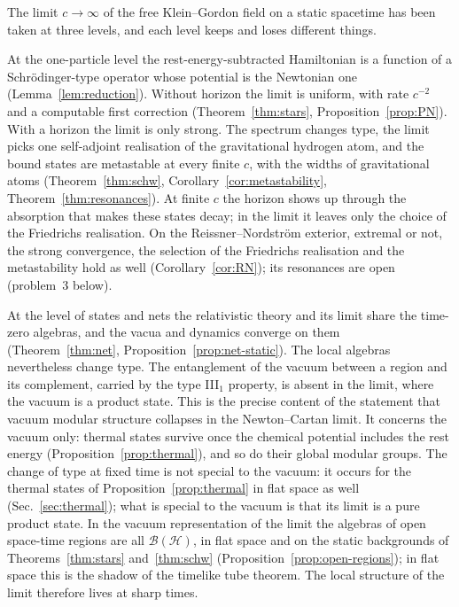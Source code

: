 \documentclass[%
 aip,
 jmp,
 amsmath,amssymb,
 reprint, onecolumn
]{revtex4-1}
\theoremstyle{definition}
\theoremstyle{remark}
\newcommand{\Hil}{\mathcal{H}}
\begin{document}
The limit $c\to\infty$ of the free Klein--Gordon field on a static
spacetime has been taken at three levels, and each level keeps and loses
different things.

At the one-particle level the rest-energy-subtracted Hamiltonian is a
function of a Schr\"odinger-type operator whose potential is the
Newtonian one (Lemma~\ref{lem:reduction}). Without horizon the limit is
uniform, with rate $c^{-2}$ and a computable first correction
(Theorem~\ref{thm:stars}, Proposition~\ref{prop:PN}). With a horizon
the limit is only strong. The spectrum changes type, the limit picks
one self-adjoint realisation of the gravitational hydrogen atom, and the
bound states are metastable at every finite $c$, with the widths of
gravitational atoms (Theorem~\ref{thm:schw},
Corollary~\ref{cor:metastability}, Theorem~\ref{thm:resonances}). At
finite $c$ the horizon shows up through the absorption that makes these
states decay; in the limit it leaves only the choice of the Friedrichs
realisation. On the Reissner--Nordstr\"om exterior, extremal or not,
the strong convergence, the selection of the Friedrichs realisation and
the metastability hold as well (Corollary~\ref{cor:RN}); its resonances
are open (problem~3 below).

At the level of states and nets the relativistic theory and its limit
share the time-zero algebras, and the vacua and dynamics converge on
them (Theorem~\ref{thm:net}, Proposition~\ref{prop:net-static}). The
local algebras nevertheless change type. The entanglement of the vacuum
between a region and its complement, carried by the type III$_1$
property, is absent in the limit, where the vacuum is a product state.
This is the precise content of the statement that vacuum modular
structure collapses in the Newton--Cartan limit. It concerns the vacuum
only: thermal states survive once the chemical potential includes the
rest energy (Proposition~\ref{prop:thermal}), and so do their global
modular groups. The change of type at fixed time is not special to the
vacuum: it occurs for the thermal states of
Proposition~\ref{prop:thermal} in flat space as well
(Sec.~\ref{sec:thermal}); what is special to the vacuum is that its
limit is a pure product state. In the vacuum representation of the limit the algebras of
open space-time regions are all $\mathcal{B}(\Hil)$, in flat space and on
the static backgrounds of
Theorems~\ref{thm:stars} and~\ref{thm:schw}
(Proposition~\ref{prop:open-regions}); in flat space this is the shadow
of the timelike tube theorem. The local structure of the limit therefore
lives at sharp times.
\end{document}
